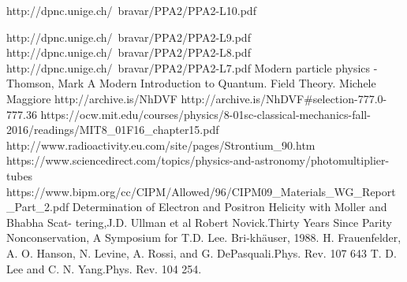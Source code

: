 \documentclass[10pt,swedish, openany]{book}
\begin{document}


\begin{thebibliography}{}
\bibitem{}
http://dpnc.unige.ch/~bravar/PPA2/PPA2-L10.pdf

\bibitem{}
http://dpnc.unige.ch/~bravar/PPA2/PPA2-L9.pdf
\bibitem{}
http://dpnc.unige.ch/~bravar/PPA2/PPA2-L8.pdf
\bibitem{}
http://dpnc.unige.ch/~bravar/PPA2/PPA2-L7.pdf
\bibitem{}
 Modern particle physics - Thomson, Mark 
 \bibitem{}
 A Modern Introduction to Quantum. Field Theory. Michele Maggiore
 \bibitem{}
 http://archive.is/NhDVF
 \bibitem{}
 http://archive.is/NhDVF\#selection-777.0-777.36
 \bibitem{}
 https://ocw.mit.edu/courses/physics/8-01sc-classical-mechanics-fall-2016/readings/MIT8\_01F16\_chapter15.pdf
 \bibitem{}
 http://www.radioactivity.eu.com/site/pages/Strontium\_90.htm
 \bibitem{}
 https://www.sciencedirect.com/topics/physics-and-astronomy/photomultiplier-tubes
 \bibitem{}
 https://www.bipm.org/cc/CIPM/Allowed/96/CIPM09\_Materials\_WG\_Report\_Part\_2.pdf
 \bibitem{}
  Determination of Electron and Positron Helicity with Moller and Bhabha Scat- tering,J.D. Ullman et al
    Robert Novick.Thirty Years Since Parity Nonconservation, A Symposium for T.D. Lee. Bri-khäuser, 1988.
    H. Frauenfelder, A. O. Hanson, N. Levine, A. Rossi, and G. DePasquali.Phys. Rev. 107 643
    T. D. Lee and C. N. Yang.Phys. Rev. 104 254.
 \end{thebibliography}
\end{document}
